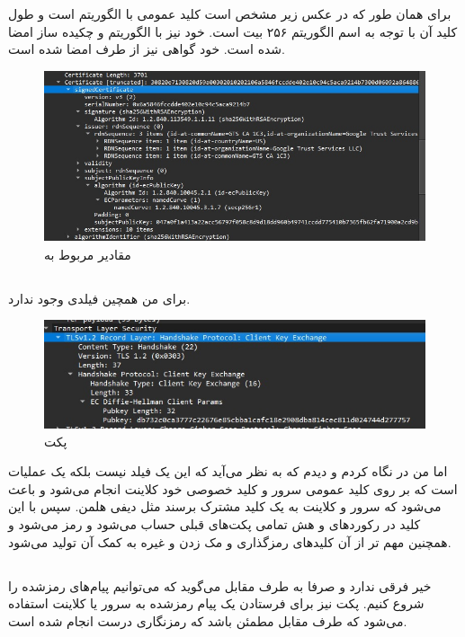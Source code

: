 \documentclass[]{article}
\begin{document}
برای
همان طور که در عکس زیر مشخص است کلید عمومی با الگوریتم
است و طول کلید آن با توجه به اسم الگوریتم ۲۵۶ بیت است. خود
نیز با الگوریتم
 و چکیده ساز 
امضا شده است. خود گواهی نیز از طرف
امضا شده است.
\begin{figure}[h]
    \centering
    \includegraphics[scale=0.5]{pics/tls-cert.jpg}
    \caption{مقادیر مربوط به }
\end{figure}
\subsection{}
برای من همچین فیلدی وجود ندارد.
\begin{figure}[h]
    \centering
    \includegraphics[scale=0.5]{pics/tls-client-key-exchange.jpg}
    \caption{پکت }
\end{figure}
اما من در
نگاه کردم و دیدم که به نظر می‌آید که این یک فیلد نیست بلکه یک عملیات است که بر روی کلید عمومی
سرور و کلید خصوصی خود کلاینت انجام می‌شود و باعث می‌شود که سرور و کلاینت به یک کلید مشترک برسند مثل دیفی هلمن.
سپس با این کلید در رکورد‌های
 و 
هش تمامی پکت‌های قبلی حساب می‌شود و رمز می‌شود و همچنین مهم تر از آن کلید‌های رمزگذاری و مک زدن و غیره به کمک آن تولید می‌شود.
\subsection{}
خیر فرقی ندارد و صرفا به طرف مقابل می‌گوید که می‌توانیم پیام‌های رمزشده را شروع کنیم. پکت
نیز برای فرستادن یک پیام رمزشده به سرور یا کلاینت استفاده می‌شود که طرف مقابل مطمئن باشد که
رمزنگاری درست انجام شده است.
\end{document}
